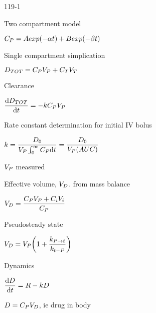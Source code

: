 \begin{mitframe}{119-1}
\begin{listone}
	\item Two compartment model
    \item $\cp=\helmholtz{exp}(-\tdiff\timet)+\exergy{exp}(-\texpcoeff\timet)$
    \item Single compartment simplication
    \item $\elecdisplace_{TOT}=\cp\vol_{\p}+\conc_{\Temp}\vol_{\Temp}$
    	\begin{listtwo}
        	\item Clearance
            	\begin{listthree}
                	\item $\dfrac{\mathrm{d}\elecdisplace_{TOT}}{\mathrm{d}\timet}=-\thermcond\cp\vol_{\p}$
                \end{listthree}
        	\item Rate constant determination for initial IV bolus
            	\begin{listthree}
                  \item $\thermcond=\dfrac{\elecdisplace_{\init}}{\vol_{\p}\int_{\init}^{\infty}\cp\mathrm{d}\timet}=\dfrac{\elecdisplace_{\init}}{\vol_{\p}(\helmholtz\uvel\conc)}$
                  \item $\vol_{\p}$ measured
                \end{listthree}
        \item Effective volume, $\vol_{\elecdisplace}$. from mass balance
        		\begin{listthree}
                	\item $\vol_{\elecdisplace}=\dfrac{\cp\vol_{\p}+\conc_{\state}\vol_{\state}}{\cp}$
                    \item Pseudosteady state
                    		\begin{listfour}
                            \item $\vol_{\elecdisplace}=\vol_{\p}\bigg(1+\dfrac{\thermcond_{\p\rightarrow\timet}}{\thermcond_{\timet-\p}}\bigg)$
                            \end{listfour}
                \end{listthree}
        \item Dynamics
        		\begin{listthree}
                	\item $\dfrac{\mathrm{d}\elecdisplace}{\mathrm{d}\timet}=\gasconst-\thermcond\elecdisplace$
                    \item $\elecdisplace=\cp\vol_{\elecdisplace}$, ie drug in body
                \end{listthree}
        \end{listtwo}
\end{listone}
\end{mitframe}